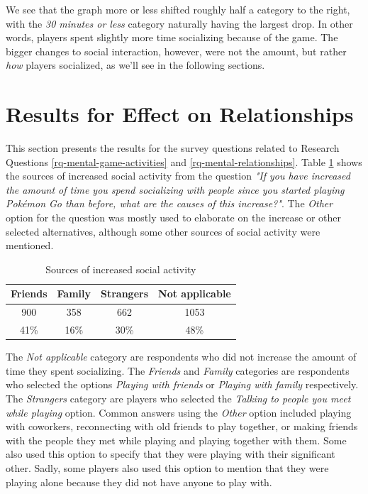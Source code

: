 We see that the graph more or less shifted roughly half a category to the right, with the \emph{30 minutes or less} category naturally having the largest drop. In other words, players spent slightly more time socializing because of the game. The bigger changes to social interaction, however, were not the amount, but rather \emph{how} players socialized, as we'll see in the following sections.


\section{Results for Effect on Relationships}

This section presents the results for the survey questions related to Research Questions \ref{rq-mental-game-activities} and \ref{rq-mental-relationships}. Table \ref{tbl:increased-social-activity-sources} shows the sources of increased social activity from the question \emph{"If you have increased the amount of time you spend socializing with people since you started playing Pokémon Go than before, what are the causes of this increase?"}. The \emph{Other} option for the question was mostly used to elaborate on the increase or other selected alternatives, although some other sources of social activity were mentioned.

\begin{table}[h]
	\centering
	\caption{Sources of increased social activity}
	\label{tbl:increased-social-activity-sources}
	\begin{tabular}{|c|c|c|c|}
		\hline
		\textbf{Friends} & \textbf{Family} & \textbf{Strangers} & \textbf{Not applicable}\\
		\hline\hline
		900		& 358	& 662	& 1053\\
		41\%	& 16\%	& 30\%	& 48\%\\\hline
	\end{tabular}
\end{table}

The \emph{Not applicable} category are respondents who did not increase the amount of time they spent socializing. The \emph{Friends} and \emph{Family} categories are respondents who selected the options \emph{Playing with friends} or \emph{Playing with family} respectively. The \emph{Strangers} category are players who selected the \emph{Talking to people you meet while playing} option. Common answers using the \emph{Other} option included playing with coworkers, reconnecting with old friends to play together, or making friends with the people they met while playing and playing together with them. Some also used this option to specify that they were playing with their significant other. Sadly, some players also used this option to mention that they were playing alone because they did not have anyone to play with.

